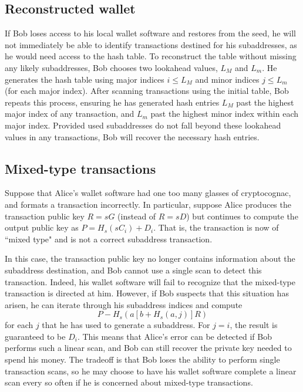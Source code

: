 \documentclass{mrl}
\begin{document}
\subsection{Reconstructed wallet}
If Bob loses access to his local wallet software and restores from the seed, he will not immediately be able to identify transactions destined for his subaddresses, as he would need access to the hash table. To reconstruct the table without missing any likely subaddresses, Bob chooses two lookahead values, $L_M$ and $L_m$. He generates the hash table using major indices $i \leq L_M$ and minor indices $j \leq L_m$ (for each major index). After scanning transactions using the initial table, Bob repeats this process, ensuring he has generated hash entries $L_M$ past the highest major index of any transaction, and $L_m$ past the highest minor index within each major index. Provided used subaddresses do not fall beyond these lookahead values in any transactions, Bob will recover the necessary hash entries.

\subsection{Mixed-type transactions}
Suppose that Alice's wallet software had one too many glasses of cryptocognac, and formats a transaction incorrectly. In particular, suppose Alice produces the transaction public key $R = sG$ (instead of $R = sD$) but continues to compute the output public key as $P = H_s(sC_i) + D_i$. That is, the transaction is now of ``mixed type" and is not a correct subaddress transaction.

In this case, the transaction public key no longer contains information about the subaddress destination, and Bob cannot use a single scan to detect this transaction. Indeed, his wallet software will fail to recognize that the mixed-type transaction is directed at him. However, if Bob suspects that this situation has arisen, he can iterate through his subaddress indices and compute
$$P - H_s(a[b+H_s(a,j)]R)$$
for each $j$ that he has used to generate a subaddress. For $j = i$, the result is guaranteed to be $D_i$. This means that Alice's error can be detected if Bob performs such a linear scan, and Bob can still recover the private key needed to spend his money. The tradeoff is that Bob loses the ability to perform single transaction scans, so he may choose to have his wallet software complete a linear scan every so often if he is concerned about mixed-type transactions.
\end{document}

